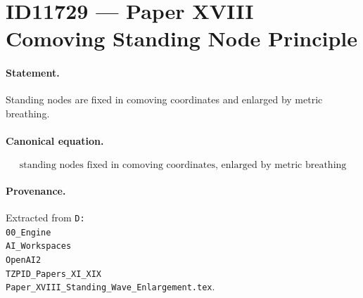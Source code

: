 \section*{ID11729 --- Paper XVIII Comoving Standing Node Principle}

\paragraph{Statement.}
Standing nodes are fixed in comoving coordinates and enlarged by metric breathing.

\paragraph{Canonical equation.}
\[
\text{standing nodes fixed in comoving coordinates, enlarged by metric breathing}
\]

\paragraph{Provenance.}
Extracted from \texttt{D:\\00\_Engine\\AI\_Workspaces\\OpenAI2\\TZPID\_Papers\_XI\_XIX\\Paper\_XVIII\_Standing\_Wave\_Enlargement.tex}.
